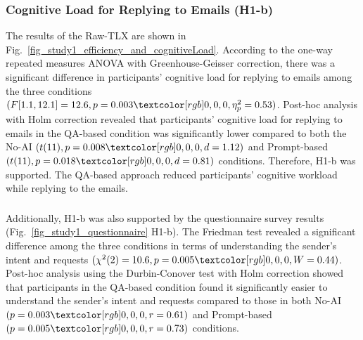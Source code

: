 \subsubsection{Cognitive Load for Replying to Emails (H1-b)}
\label{sec:result1_cognitive_load}
The results of the Raw-TLX are shown in Fig.~\ref{fig_study1_efficiency_and_cognitiveLoad}.
According to the one-way repeated measures ANOVA with Greenhouse-Geisser correction, there was a significant difference in participants' cognitive load for replying to emails among the three conditions $(F[1.1, 12.1]=12.6, p=0.003\red{, \eta_p^2=0.53})$. 
Post-hoc analysis with Holm correction revealed that participants' cognitive load for replying to emails in the QA-based condition was significantly lower compared to both the No-AI $(t(11), p=0.008\red{, d=1.12})$ and Prompt-based $(t(11), p=0.018\red{, d=0.81})$ conditions.
Therefore, H1-b was supported.
The QA-based approach reduced participants’ cognitive workload while replying to the emails.

\subsubsection{}
\label{sec:result1_difficulty_in_understanding}
Additionally, H1-b was also supported by the questionnaire survey results (Fig.~\ref{fig_study1_questionnaire} H1-b).
The Friedman test revealed a significant difference among the three conditions in terms of understanding the sender's intent and requests $(\chi^2(2)=10.6, p=0.005\red{, W=0.44})$. 
Post-hoc analysis using the Durbin-Conover test with Holm correction showed that participants in the QA-based condition found it significantly easier to understand the sender's intent and requests compared to those in both No-AI $(p=0.003\red{, r=0.61})$ and Prompt-based $(p=0.005\red{, r=0.73})$ conditions.

